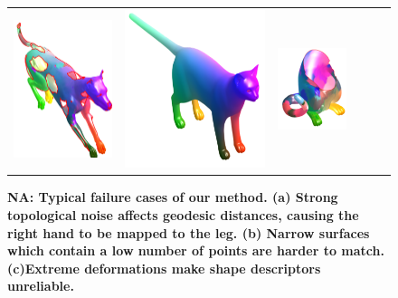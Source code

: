 \documentclass[10pt,twocolumn,letterpaper]{article}
\newcommand{\colornote}[3]{{\color{#1}\bf{#2: #3}\normalfont}}
\newcommand{\colornote}[3]{}
\newcommand {\nadav}[1]{\colornote{red}{NA}{#1}}
\begin{document}
\begin{figure}[htb]
\begin{tabular}{cccccc}
	\includegraphics[scale=0.7]{figures/FailHolesmatch.png} &
	\includegraphics[scale=0.7]{figures/FailCutsbase.png} &
	\includegraphics[scale=0.7]{figures/FailCutsMatch.png}
\end{tabular}
\caption{\nadav{Typical failure cases of our method.
		 (a) Strong topological noise affects geodesic distances, causing the right hand to be mapped to the leg.
		 (b) Narrow surfaces which contain a low number of points are harder to match.
	     (c)Extreme deformations make shape descriptors unreliable.}}
	\label{fig:FailureCases}
\end{figure}
\end{document}
